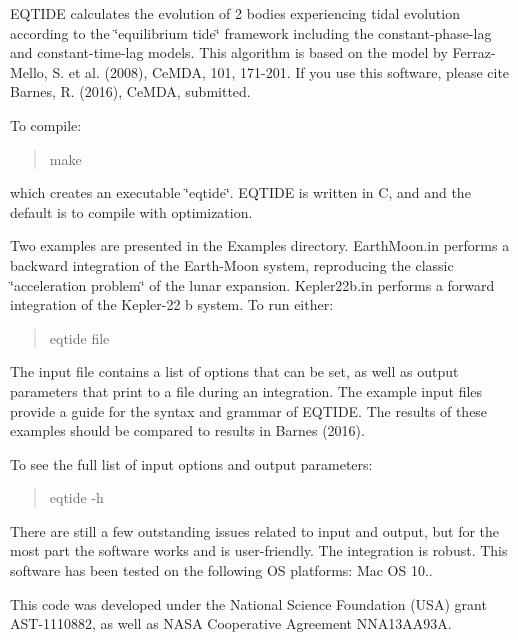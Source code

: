 E\+Q\+T\+I\+D\+E calculates the evolution of 2 bodies experiencing tidal evolution according to the \char`\"{}equilibrium tide\char`\"{} framework including the constant-\/phase-\/lag and constant-\/time-\/lag models. This algorithm is based on the model by Ferraz-\/\+Mello, S. et al. (2008), Ce\+M\+D\+A, 101, 171-\/201. If you use this software, please cite Barnes, R. (2016), Ce\+M\+D\+A, submitted.

To compile\+:

\begin{quote}
make \end{quote}


which creates an executable \char`\"{}eqtide\char`\"{}. E\+Q\+T\+I\+D\+E is written in C, and and the default is to compile with optimization.

Two examples are presented in the Examples directory. Earth\+Moon.\+in performs a backward integration of the Earth-\/\+Moon system, reproducing the classic \char`\"{}acceleration problem\char`\"{} of the lunar expansion. Kepler22b.\+in performs a forward integration of the Kepler-\/22 b system. To run either\+:

\begin{quote}
eqtide file \end{quote}


The input file contains a list of options that can be set, as well as output parameters that print to a file during an integration. The example input files provide a guide for the syntax and grammar of E\+Q\+T\+I\+D\+E. The results of these examples should be compared to results in Barnes (2016).

To see the full list of input options and output parameters\+:

\begin{quote}
eqtide -\/h \end{quote}


There are still a few outstanding issues related to input and output, but for the most part the software works and is user-\/friendly. The integration is robust. This software has been tested on the following O\+S platforms\+: Mac O\+S 10..

This code was developed under the National Science Foundation (U\+S\+A) grant A\+S\+T-\/1110882, as well as N\+A\+S\+A Cooperative Agreement N\+N\+A13\+A\+A93\+A. 